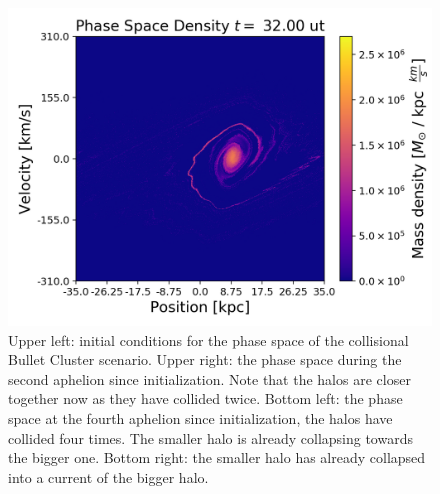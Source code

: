 {\begin{figure}[h!]
    \includegraphics[scale=0.45]{imag/cBulletPhase80.png}
    \caption{Upper left: initial conditions for the phase space of the collisional Bullet Cluster scenario. Upper right: the phase space during the second aphelion since initialization. Note that the halos are closer together now as they have collided twice.  Bottom left: the phase space at the fourth aphelion since initialization, the halos have collided four times. The smaller halo is already collapsing towards the bigger one. Bottom right: the smaller halo has already collapsed into a current of  the bigger halo.}
    \label{phaseColBullet}
\end{figure}

}
